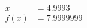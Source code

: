 \documentclass[preview]{standalone}
\begin{document}
\begin{align*}
x &= 4.9993\\f(x) &= 7.9999999
\end{align*}
\end{document}
